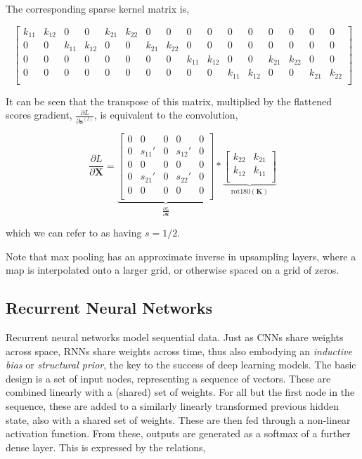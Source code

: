 \documentclass[11pt]{amsart}
\begin{document}
The corresponding sparse kernel matrix is,

\setcounter{MaxMatrixCols}{20}

$$
\begin{bmatrix}
k_{11} & k_{12} & 0 & 0 & k_{21} & k_{22} & 0 & 0 & 0 & 0 & 0 & 0 & 0 & 0 & 0 & 0 \\
0 & 0 & k_{11} & k_{12} & 0 & 0 & k_{21} & k_{22} & 0 & 0 & 0 & 0 & 0 & 0 & 0 & 0 \\
0 & 0 & 0 & 0 & 0 & 0 & 0 & 0 & k_{11} & k_{12} & 0 & 0 & k_{21} & k_{22} & 0 & 0 \\
0 & 0 & 0 & 0 & 0 & 0 & 0 & 0 & 0 & 0 & k_{11} & k_{12} & 0 & 0 & k_{21} & k_{22} \\
\end{bmatrix}
$$

It can be seen that the transpose of this matrix, multiplied by the flattened scores gradient, $\frac{\partial L}{\partial \mathbf{s}^{(l)}}$, is equivalent to the convolution,

$$\frac{\partial L}{\partial \mathbf{X}}=
\underbrace{\begin{bmatrix}
0 & 0 & 0 & 0 & 0 \\
0 & s_{11}' & 0 & s_{12}' & 0 \\
0 & 0 & 0 & 0 & 0 \\
0 & s_{21}' & 0 & s_{22}' & 0 \\
0 & 0 & 0 & 0 & 0 \\
\end{bmatrix}}_{\frac{\partial L}{\partial \mathbf{S}}} * 
\underbrace{\begin{bmatrix}
k_{22} & k_{21} \\
k_{12} & k_{11} \\
\end{bmatrix}}_{\text{rot180}(\mathbf{K})}
$$

which we can refer to as having $s = 1/2$.

Note that max pooling has an approximate inverse in upsampling layers, where a map is interpolated onto a larger grid, or otherwise spaced on a grid of zeros.

\subsection{Recurrent Neural Networks}

Recurrent neural networks model sequential data. Just as CNNs share weights across space, RNNs share weights across time, thus also embodying an \emph{inductive bias} or \emph{structural prior}, the key to the success of deep learning models. The basic design is a set of input nodes, representing a sequence of vectors. These are combined linearly with a (shared) set of weights.  For all but the first node in the sequence, these are added to a similarly linearly transformed previous hidden state, also with a shared set of weights. These are then fed through a non-linear activation function. From these, outputs are generated as a softmax of a further dense layer. This is expressed by the relations,
\end{document}
